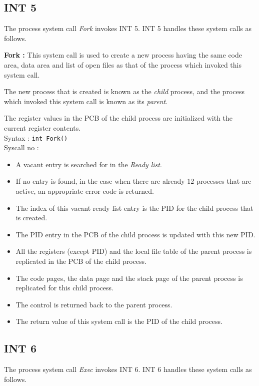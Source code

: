 \documentclass[10pt]{report}
\newcommand\counter[1]{\arabic{#1} \stepcounter{#1}}
\newcounter{syscall}
\begin{document}
\subsection{INT 5}
The process system call \textit{Fork} invokes INT 5. INT 5 handles these system calls as follows.

\textbf{Fork :}  This system call is used to create a new process having the same code area, data area and list of open files as that of the process which invoked this system call.

The new process that is created is known as the \emph{child} process, and the process which invoked this system call is known as its \emph{parent}.

The register values in the PCB of the child process are initialized with the current register contents.\\
Syntax : \texttt{int Fork()} \\
Syscall no : \counter{syscall}
\begin{itemize}
	\item A vacant entry is searched for in the \emph{Ready list}.
	\item If no entry is found, in the case when there are already 12 processes that are active, an appropriate error code is returned.
	\item The index of this vacant ready list entry is the PID for the child process that is created.
	\item The PID entry in the PCB of the child process is updated with this new PID.
	\item All the registers (except PID) and the local file table of the parent process is replicated in the PCB of the child process.
	\item The code pages, the data page and the stack page of the parent process is replicated for this child process.
	\item The control is returned back to the parent process.
	\item The return value of this system call is the PID of the child process.
\end{itemize}

\subsection{INT 6}
The process system call \textit{Exec} invokes INT 6. INT 6 handles these system calls as follows.
\end{document}
